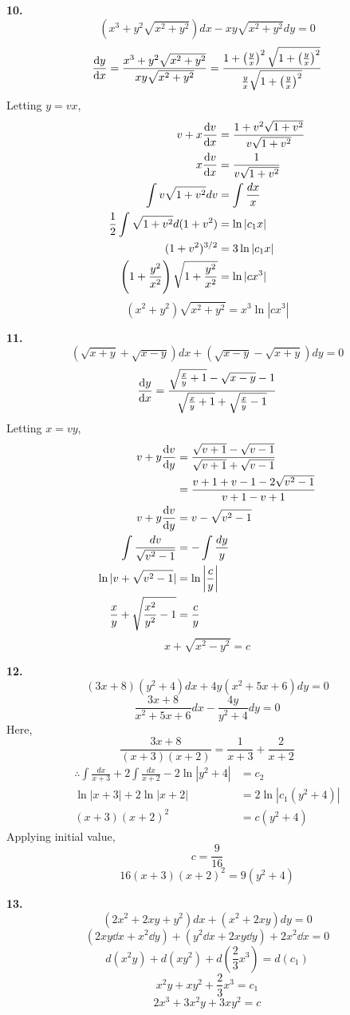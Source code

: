 {    \textbf{10.}
    \[ (x^3+y^2 \sqrt{x^2+y^2}) d{x} - xy \sqrt{x^2+y^2} d{y} = 0 \]
    \[ \dv{y}{x} = \frac{x^3+y^2 \sqrt{x^2+y^2}}{xy \sqrt{x^2+y^2}} = \frac{1+\left(\frac{y}{x}\right)^2 \sqrt{1 + \left(\frac{y}{x}\right)^2}}{\frac{y}{x}\sqrt{1+\left(\frac{y}{x}\right)^2}} \]
    Letting $y = vx$,
    \begin{align*}
        v + x \dv{v}{x} &= \frac{1 + v^2 \sqrt{1+v^2}}{v \sqrt{1+v^2}} \\
        x\dv{v}{x} &= \frac{1}{v \sqrt{1+v^2}} \\
        \int{v \sqrt{1+v^2}} d{v} &= \int{\frac{dx}{x}} \\
        \frac{1}{2} \int{\sqrt{1+v^2}} d{(1+v^2)} &= \ln|c_1x| \\
        (1+v^2)^{3/2} &= 3\ln|c_1x| \\
        \left( 1+\frac{y^2}{x^2} \right)\sqrt{1 + \frac{y^2}{x^2}} &= \ln|cx^3|
    \end{align*}
    \[ \boxed{(x^2+y^2)\sqrt{x^2+y^2} = x^3\ln|cx^3|} \]

    \textbf{11.}
    \[ (\sqrt{x+y} + \sqrt{x-y}) d{x} + (\sqrt{x-y} - \sqrt{x+y}) d{y} = 0 \]
    \[ \dv{y}{x} = \frac{\sqrt{\frac{x}{y}+1} - \sqrt{x-y}-1}{\sqrt{\frac{x}{y}+1} + \sqrt{\frac{x}{y}-1}} \]
    Letting $x = vy$,
    \begin{align*}
        v + y\dv{v}{y} &= \frac{\sqrt{v+1} - \sqrt{v-1}}{\sqrt{v+1} + \sqrt{v-1}} \\
        &= \frac{v+1+v-1-2\sqrt{v^2-1}}{v+1-v+1} \\
        v + y\dv{v}{y} &= v - \sqrt{v^2-1} \\
        \int{ \frac{dv}{\sqrt{v^2-1}} } &= -\int{ \frac{dy}{y} } \\
        \ln |v + \sqrt{v^2-1}| &= \ln \left| \frac{c}{y} \right| \\
        \frac{x}{y} + \sqrt{\frac{x^2}{y^2} - 1} &= \frac{c}{y} \\
    \end{align*}
    \[ \boxed{ x + \sqrt{x^2-y^2}  = c } \]

    \textbf{12.}
    \[ (3x+8)(y^2+4) d{x} + 4y(x^2+5x+6) d{y} = 0 \]
    \[ \frac{3x+8}{x^2+5x+6} d{x} - \frac{4y}{y^2+4} d{y} = 0 \]
    Here, \[
        \frac{3x+8}{(x+3)(x+2)} = \frac{1}{x+3} + \frac{2}{x+2}
    \]
    \begin{align*}
        \therefore \int{ \frac{dx}{x+3} } + 2\int{ \frac{dx}{x+2} } - 2\ln|y^2+4| &= c_2 \\
        \ln|x+3| + 2\ln|x+2| &= 2\ln|c_1(y^2+4)| \\
        (x+3)(x+2)^2 &= c(y^2+4)
    \end{align*}
    Applying initial value,
    \[ c = \frac{9}{16} \]
    \[ \boxed{ 16(x+3)(x+2)^2 = 9(y^2+4) } \]

    \textbf{13.}
    \[ (2x^2+2xy+y^2) d{x} + (x^2+2xy) d{y} = 0 \]
    \[ (2xy \dd{x} + x^2 \dd{y}) + (y^2 \dd{x} + 2xy \dd{y}) + 2x^2 \dd{x} = 0 \]
    \[ d(x^2y) + d(xy^2) + d\left( \frac{2}{3}x^3 \right) = d(c_1) \]
    \[ x^2y + xy^2 + \frac{2}{3}x^3 = c_1 \]
    \[ \boxed{ 2x^3 + 3x^2y + 3xy^2 = c } \]
}


